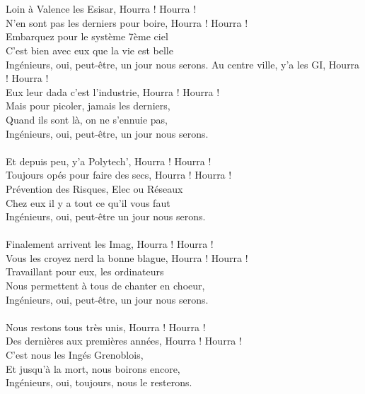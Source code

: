 \\\\Loin à Valence les Esisar, Hourra ! Hourra !
\\N'en sont pas les derniers pour boire, Hourra ! Hourra !
\\Embarquez pour le système 7ème ciel
\\C'est bien avec eux que la vie est belle
\\Ingénieurs, oui, peut-être, un jour nous serons.
\breakpage
Au centre ville, y'a les GI, Hourra ! Hourra !
\\Eux leur dada c'est l'industrie, Hourra ! Hourra !
\\Mais pour picoler, jamais les derniers,
\\Quand ils sont là, on ne s'ennuie pas,
\\Ingénieurs, oui, peut-être, un jour nous serons.
\\\\Et depuis peu, y'a Polytech', Hourra ! Hourra !
\\Toujours opés pour faire des secs, Hourra ! Hourra !
\\Prévention des Risques, Elec ou Réseaux
\\Chez eux il y a tout ce qu'il vous faut
\\Ingénieurs, oui, peut-être un jour nous serons.
\\\\Finalement arrivent les Imag, Hourra ! Hourra !
\\Vous les croyez nerd la bonne blague, Hourra ! Hourra !
\\Travaillant pour eux, les ordinateurs
\\Nous permettent à tous de chanter en choeur,
\\Ingénieurs, oui, peut-être, un jour nous serons.
\\\\Nous restons tous très unis, Hourra ! Hourra !
\\Des dernières aux premières années, Hourra ! Hourra !
\\C'est nous les Ingés Grenoblois,
\\Et jusqu'à la mort, nous boirons encore,
\\Ingénieurs, oui, toujours, nous le resterons.

\breakpage

